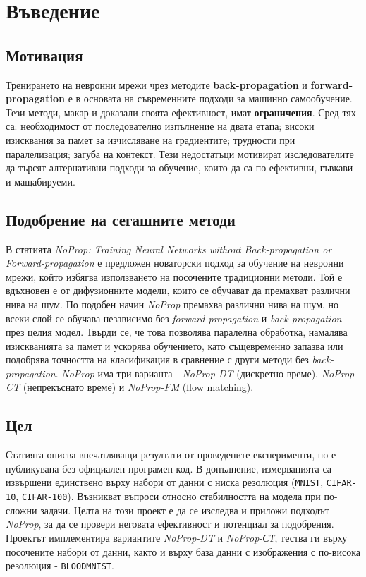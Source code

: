 \documentclass[a4paper,11pt]{article}
\begin{document}
\newpage

\tableofcontents
\newpage


\section{Въведение}

\subsection{Мотивация}

Тренирането на невронни мрежи чрез методите \textbf{back-propagation} и \textbf{forward-propagation} е в основата на съвременните подходи за машинно самообучение. Тези методи, макар и доказали своята ефективност, имат \textbf{ограничения}. Сред тях са: необходимост от последователно изпълнение на двата етапа; високи изисквания за памет за изчисляване на градиентите; трудности при паралелизация; загуба на контекст. Тези недостатъци мотивират изследователите да търсят алтернативни подходи за обучение, които да са по-ефективни, гъвкави и мащабируеми.

\subsection{Подобрение на сегашните методи}

В статията \emph{NoProp: Training Neural Networks without Back-propagation or Forward-propagation}\cite{li2025noproptrainingneuralnetworks} е предложен новаторски подход за обучение на невронни мрежи, който избягва използването на посочените традиционни методи. Той е вдъхновен е от дифузионните модели, които се обучават да премахват различни нива на шум. По подобен начин \emph{NoProp} премахва различни нива на шум, но всеки слой се обучава независимо без \emph{forward-propagation} и \emph{back-propagation} през целия модел. Твърди се, че това позволява паралелна обработка, намалява изискванията за памет и ускорява обучението, като същевременно запазва или подобрява точността на класификация в сравнение с други методи без \emph{back-propagation}. \emph{NoProp} има три варианта - \emph{NoProp-DT} (дискретно време), \emph{NoProp-CT} (непрекъснато време) и \emph{NoProp-FM} (flow matching).

\subsection{Цел}
Статията описва впечатляващи резултати от проведените експерименти, но е публикувана без официален програмен код. В допълнение, измерванията са извършени единствено върху набори от данни с ниска резолюция (\texttt{MNIST}, \texttt{CIFAR-10}, \texttt{CIFAR-100}). Възникват въпроси относно стабилността на модела при по-сложни задачи. 
Целта на този проект е да се изследва и приложи подходът \emph{NoProp}, за да се провери неговата ефективност и потенциал за подобрения. Проектът имплементира вариантите \emph{NoProp-DT} и  \emph{NoProp-СТ}, тества ги върху посочените набори от данни, както и върху база данни с изображения с по-висока резолюция - \texttt{BLOODMNIST}.
\end{document}
